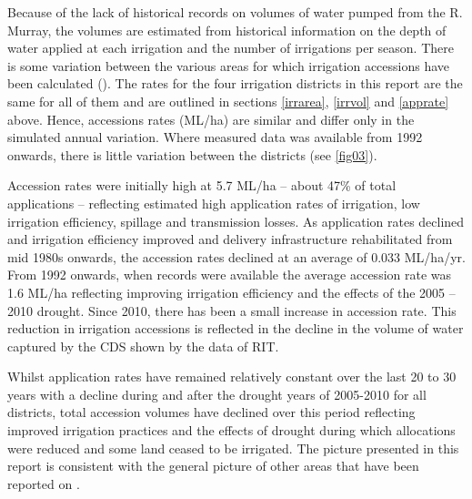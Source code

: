 \documentclass[a4paper, titlepage, 12pt]{article}\usepackage[]{graphicx}\usepackage[]{color}
\begin{document}
\begin{sffamily}
Because of the lack of historical records on volumes of water pumped from the R. Murray, the volumes are estimated from historical information on the depth of water applied at each irrigation and the number of irrigations per season. There is some variation between the various areas for which irrigation accessions have been calculated (\citep{Meissner2014, Meissner2012, Meissner2011a, Meissner2011b, Adams2009}). The rates for the four irrigation districts in this report are the same for all of them and are outlined in sections \ref{irrarea}, \ref{irrvol} and \ref{apprate} above. Hence, accessions rates (ML/ha) are similar and differ only in the simulated annual variation. Where measured data was available from 1992 onwards, there is little variation between the districts (see \ref{fig03}).

Accession rates were initially high at 5.7 ML/ha -- about 47\% of total applications -- reflecting estimated high application rates of irrigation, low irrigation efficiency, spillage and transmission losses. As application rates declined and irrigation efficiency improved and delivery infrastructure rehabilitated from mid 1980s onwards, the accession rates declined at an average of 0.033 ML/ha/yr. From 1992 onwards, when records were available the average accession rate was 1.6 ML/ha reflecting improving irrigation efficiency and the effects of the 2005 -- 2010 drought. Since 2010, there has been a small increase in accession rate. This reduction in irrigation accessions is reflected in the decline in the volume of water captured by the CDS shown by the data of RIT.

Whilst application rates have remained relatively constant over the last 20 to 30 years with a decline during and after the drought years of 2005-2010 for all districts, total accession volumes have declined over this period reflecting improved irrigation practices and the effects of drought during which allocations were reduced and some land ceased to be irrigated. The picture presented in this report is consistent with the general picture of other areas that have been reported on \citep{Meissner2014, Meissner2012, Meissner2011a, Meissner2011b, Adams2009}.
   

\end{sffamily}
\end{document}
